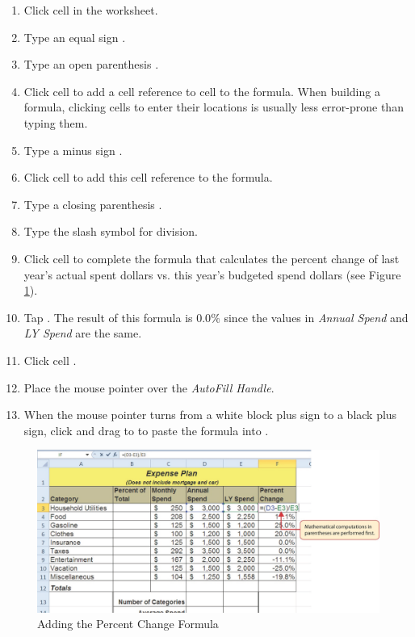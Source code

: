 \begin{enumbox}
	\begin{enumerate}
		\item Click cell  in the  worksheet.
		\item Type an equal sign \fmtTyping{=}.
		\item Type an open parenthesis \fmtTyping{(}.
		\item Click cell  to add a cell reference to cell  to the formula. When building a formula, clicking cells to enter their locations is usually less error-prone than typing them.
		\item Type a minus sign \fmtTyping{-}.
		\item Click cell  to add this cell reference to the formula.
		\item Type a closing parenthesis \fmtTyping{)}.
		\item Type the slash \fmtTyping{/} symbol for division.
		\item Click cell  to complete the formula that calculates the percent change of last year's actual spent dollars vs. this year's budgeted spend dollars (see Figure \ref{02:fig06}).
		\item Tap . The result of this formula is $ 0.0\% $ since the values in \textit{Annual Spend} and \textit{LY Spend} are the same.
		\item Click cell .
		\item Place the mouse pointer over the \textit{AutoFill Handle}.
		\item When the mouse pointer turns from a white block plus sign to a black plus sign, click and drag to  to paste the formula into .
	\end{enumerate}
\end{enumbox}

\begin{figure}[H]
	\centering
	\includegraphics[width=\maxwidth{.95\linewidth}]{gfx/ch02_fig06}
	\caption{Adding the Percent Change Formula}
	\label{02:fig06}
\end{figure}

